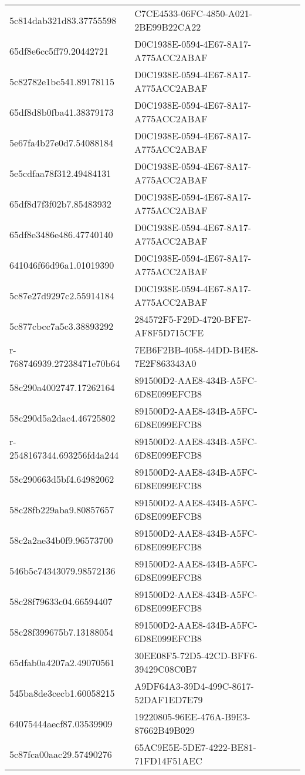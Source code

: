 \begin{tabular}{ll}
5c814dab321d83.37755598 & C7CE4533-06FC-4850-A021-2BE99B22CA22 \\
65df8e6cc5ff79.20442721 & D0C1938E-0594-4E67-8A17-A775ACC2ABAF \\
5c82782e1bc541.89178115 & D0C1938E-0594-4E67-8A17-A775ACC2ABAF \\
65df8d8b0fba41.38379173 & D0C1938E-0594-4E67-8A17-A775ACC2ABAF \\
5e67fa4b27e0d7.54088184 & D0C1938E-0594-4E67-8A17-A775ACC2ABAF \\
5e5cdfaa78f312.49484131 & D0C1938E-0594-4E67-8A17-A775ACC2ABAF \\
65df8d7f3f02b7.85483932 & D0C1938E-0594-4E67-8A17-A775ACC2ABAF \\
65df8e3486e486.47740140 & D0C1938E-0594-4E67-8A17-A775ACC2ABAF \\
641046f66d96a1.01019390 & D0C1938E-0594-4E67-8A17-A775ACC2ABAF \\
5c87e27d9297c2.55914184 & D0C1938E-0594-4E67-8A17-A775ACC2ABAF \\
5c877cbcc7a5c3.38893292 & 284572F5-F29D-4720-BFE7-AF8F5D715CFE \\
r-768746939.27238471e70b64 & 7EB6F2BB-4058-44DD-B4E8-7E2F863343A0 \\
58c290a4002747.17262164 & 891500D2-AAE8-434B-A5FC-6D8E099EFCB8 \\
58c290d5a2dac4.46725802 & 891500D2-AAE8-434B-A5FC-6D8E099EFCB8 \\
r-2548167344.693256fd4a244 & 891500D2-AAE8-434B-A5FC-6D8E099EFCB8 \\
58c290663d5bf4.64982062 & 891500D2-AAE8-434B-A5FC-6D8E099EFCB8 \\
58c28fb229aba9.80857657 & 891500D2-AAE8-434B-A5FC-6D8E099EFCB8 \\
58c2a2ae34b0f9.96573700 & 891500D2-AAE8-434B-A5FC-6D8E099EFCB8 \\
546b5c74343079.98572136 & 891500D2-AAE8-434B-A5FC-6D8E099EFCB8 \\
58c28f79633c04.66594407 & 891500D2-AAE8-434B-A5FC-6D8E099EFCB8 \\
58c28f399675b7.13188054 & 891500D2-AAE8-434B-A5FC-6D8E099EFCB8 \\
65dfab0a4207a2.49070561 & 30EE08F5-72D5-42CD-BFF6-39429C08C0B7 \\
545ba8de3cecb1.60058215 & A9DF64A3-39D4-499C-8617-52DAF1ED7E79 \\
64075444aecf87.03539909 & 19220805-96EE-476A-B9E3-87662B49B029 \\
5c87fca00aac29.57490276 & 65AC9E5E-5DE7-4222-BE81-71FD14F51AEC \\

\end{tabular}
